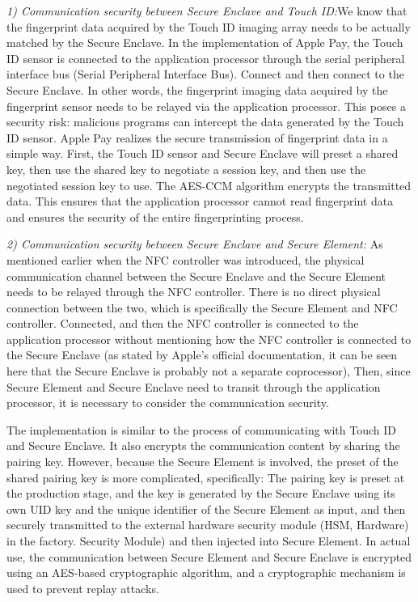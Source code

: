 \documentclass[journal]{IEEEtran}
\begin{document}
\textit{1) Communication security between Secure Enclave and Touch ID:}We know that the fingerprint data acquired by the Touch ID imaging array needs to be actually matched by the Secure Enclave. In the implementation of Apple Pay, the Touch ID sensor is connected to the application processor through the serial peripheral interface bus (Serial Peripheral Interface Bus). Connect and then connect to the Secure Enclave. In other words, the fingerprint imaging data acquired by the fingerprint sensor needs to be relayed via the application processor. This poses a security risk: malicious programs can intercept the data generated by the Touch ID sensor. Apple Pay realizes the secure transmission of fingerprint data in a simple way. First, the Touch ID sensor and Secure Enclave will preset a shared key, then use the shared key to negotiate a session key, and then use the negotiated session key to use. The AES-CCM algorithm encrypts the transmitted data. This ensures that the application processor cannot read fingerprint data and ensures the security of the entire fingerprinting process.
    
\textit{2) Communication security between Secure Enclave and Secure Element: }  
As mentioned earlier when the NFC controller was introduced, the physical communication channel between the Secure Enclave and the Secure Element needs to be relayed through the NFC controller. There is no direct physical connection between the two, which is specifically the Secure Element and NFC controller. Connected, and then the NFC controller is connected to the application processor without mentioning how the NFC controller is connected to the Secure Enclave (as stated by Apple's official documentation, it can be seen here that the Secure Enclave is probably not a separate coprocessor), Then, since Secure Element and Secure Enclave need to transit through the application processor, it is necessary to consider the communication security.

The implementation is similar to the process of communicating with Touch ID and Secure Enclave. It also encrypts the communication content by sharing the pairing key. However, because the Secure Element is involved, the preset of the shared pairing key is more complicated, specifically: The pairing key is preset at the production stage, and the key is generated by the Secure Enclave using its own UID key and the unique identifier of the Secure Element as input, and then securely transmitted to the external hardware security module (HSM, Hardware) in the factory. Security Module) and then injected into Secure Element. In actual use, the communication between Secure Element and Secure Enclave is encrypted using an AES-based cryptographic algorithm, and a cryptographic mechanism is used to prevent replay attacks.
\end{document}
